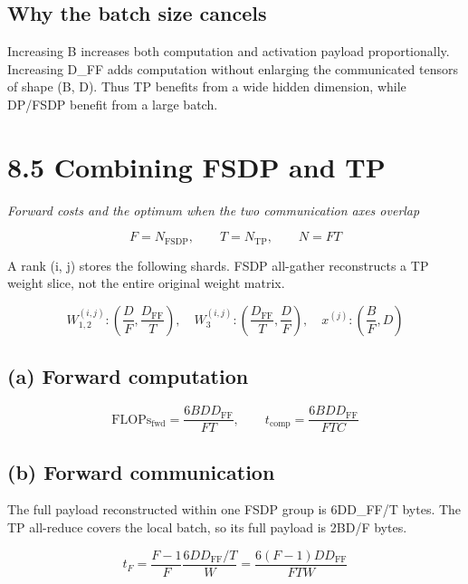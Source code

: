 \documentclass[10pt,a4paper]{article}
\begin{document}
\subsection*{Why the batch size cancels}

Increasing B increases both computation and activation payload proportionally. Increasing D\_FF adds computation without enlarging the communicated tensors of shape (B, D). Thus TP benefits from a wide hidden dimension, while DP/FSDP benefit from a large batch.\par

\clearpage

\section*{8.5 \textperiodcentered{} Combining FSDP and TP}

\textit{Forward costs and the optimum when the two communication axes overlap}\par

\[F=N_{\mathrm{FSDP}},\qquad T=N_{\mathrm{TP}},\qquad N=FT\]

A rank (i, j) stores the following shards. FSDP all-gather reconstructs a TP weight slice, not the entire original weight matrix.\par

\[W_{1,2}^{(i,j)}:\left(\frac{D}{F},\frac{D_{\mathrm{FF}}}{T}\right),\quad W_3^{(i,j)}:\left(\frac{D_{\mathrm{FF}}}{T},\frac{D}{F}\right),\quad x^{(j)}:\left(\frac{B}{F},D\right)\]

\subsection*{(a) Forward computation}

\[\boxed{\mathrm{FLOPs}_{\mathrm{fwd}}=\frac{6BDD_{\mathrm{FF}}}{FT},\qquad t_{\mathrm{comp}}=\frac{6BDD_{\mathrm{FF}}}{FTC}}\]

\subsection*{(b) Forward communication}

The full payload reconstructed within one FSDP group is 6DD\_FF/T bytes. The TP all-reduce covers the local batch, so its full payload is 2BD/F bytes.\par

\[t_F=\frac{F-1}{F}\frac{6DD_{\mathrm{FF}}/T}{W}=\frac{6(F-1)DD_{\mathrm{FF}}}{FTW}\]
\end{document}
